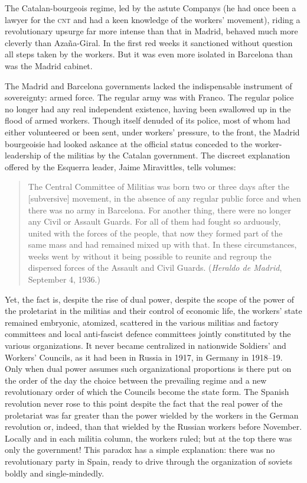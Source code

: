 The Catalan-bourgeois regime, led by the astute Companys (he had once been a lawyer for the \textsc{cnt} and had a keen knowledge of the workers’ movement), riding a revolutionary upsurge far more intense than that in Madrid, behaved much more cleverly than Azaña-Giral. In the first red weeks it sanctioned without question all steps taken by the workers. But it was even more isolated in Barcelona than was the Madrid cabinet.

The Madrid and Barcelona governments lacked the indispensable instrument of sovereignty: armed force. The regular army was with Franco. The regular police no longer had any real independent existence, having been swallowed up in the flood of armed workers. Though itself denuded of its police, most of whom had either volunteered or been sent, under workers’ pressure, to the front, the Madrid bourgeoisie had looked askance at the official status conceded to the worker-leadership of the militias by the Catalan government. The discreet explanation offered by the Esquerra leader, Jaime Miravittles, tells volumes:

\begin{quotation}
  The Central Committee of Militias was born two or three days after the [subversive] movement, in the absence of any regular public force and when there was no army in Barcelona. For another thing, there were no longer any Civil or Assault Guards. For all of them had fought so arduously, united with the forces of the people, that now they formed part of the same mass and had remained mixed up with that. In these circumstances, weeks went by without it being possible to reunite and regroup the dispersed forces of the Assault and Civil Guards. (\emph{Heraldo de Madrid}, September 4, 1936.)
\end{quotation}

Yet, the fact is, despite the rise of dual power, despite the scope of the power of the proletariat in the militias and their control of economic life, the workers’ state remained embryonic, atomized, scattered in the various militias and factory committees and local anti-fascist defence committees jointly constituted by the various organizations. It never became centralized in nationwide Soldiers’ and Workers’ Councils, as it had been in Russia in 1917, in Germany in 1918–19. Only when dual power assumes such organizational proportions is there put on the order of the day the choice between the prevailing regime and a new revolutionary order of which the Councils become the state form. The Spanish revolution never rose to this point despite the fact that the real power of the proletariat was far greater than the power wielded by the workers in the German revolution or, indeed, than that wielded by the Russian workers before November. Locally and in each militia column, the workers ruled; but at the top there was only the government! This paradox has a simple explanation: there was no revolutionary party in Spain, ready to drive through the organization of soviets boldly and single-mindedly.

